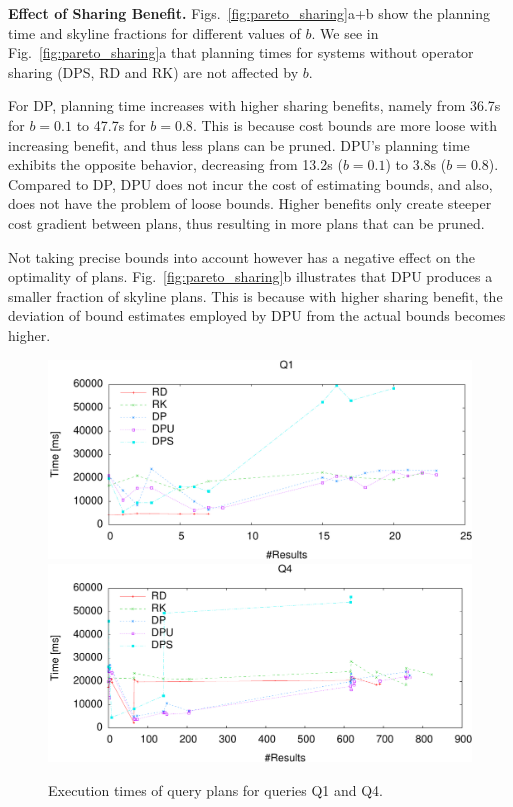 \textbf{Effect of Sharing Benefit.} Figs.~\ref{fig:pareto_sharing}a+b
show the planning time and skyline fractions for different values of $b$. We see in Fig.~\ref{fig:pareto_sharing}a that planning times for systems without operator sharing (DPS, RD and RK) are not affected by $b$. 

For DP, planning time increases with higher sharing
benefits, namely from 36.7s for $b=0.1$ to 47.7s for $b=0.8$.  This is because cost bounds
are more loose with increasing benefit, and thus less plans can be pruned. 
DPU's planning time exhibits the opposite behavior, decreasing from 13.2s ($b=0.1$) to 3.8s
($b=0.8$). Compared to DP, DPU does not incur the cost of estimating bounds, and also, does not have the problem of loose bounds. Higher benefits only create steeper cost gradient
between plans, thus resulting in more plans that can be pruned.

Not taking precise bounds into account however has a negative effect on the optimality of plans. Fig.~\ref{fig:pareto_sharing}b illustrates that DPU produces a smaller fraction of skyline plans. This is because with higher sharing benefit, the deviation of bound estimates employed by DPU from the actual bounds becomes higher.  


\begin{figure}[htb]
  \vspace{-0.3cm}
  \centering
  \includegraphics[width=0.82\linewidth]{figs/pareto_exec_0_q2-crop.pdf}
  \includegraphics[width=0.82\linewidth]{figs/pareto_exec_0_q19-crop.pdf}
  \caption{Execution times of query plans for queries Q1 and Q4.}
  \label{fig:exec}
  \vspace{-0.6cm}
\end{figure}


